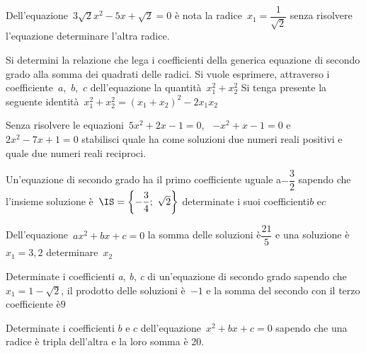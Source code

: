 \begin{esercizio}
 \label{ese:3.69}
Dell'equazione~\(3 \sqrt{2} x^{2}-5 x + \sqrt{2} = 0\) 
è nota la radice~\(x_{1} = \dfrac{1}{\sqrt{2}}\) 
senza risolvere l'equazione determinare l'altra radice.
\end{esercizio}

\begin{esercizio}
 \label{ese:3.70}
Si determini la relazione che lega i coefficienti della generica equazione 
di secondo grado alla somma dei quadrati delle radici. Si vuole esprimere,
attraverso i coefficiente~\(a\),~\(b\),~\(c\) dell'equazione la 
quantità~\(x_{1}^{2} + x_{2}^{2}\) 
Si tenga presente la seguente identità~\(x_{1}^{2} + x_{2}^{2} = 
(x_{1} + x_{2} )^{2}-2 x_{1} x_{2}\)
\end{esercizio}

\begin{esercizio}
 \label{ese:3.71}
Senza risolvere le equazioni~\(5 x^{2} + 2 x-1 = 0\), 
~\(-x^{2} + x-1 = 0\) e~\(2 x^{2}-7 x +1 = 0\) stabilisci quale ha come 
soluzioni due numeri reali positivi e quale due numeri reali reciproci.
\end{esercizio}

\begin{esercizio}
 \label{ese:3.72}
Un'equazione di secondo grado ha il primo coefficiente uguale a\(- 
\dfrac{3}{2}\) 
sapendo che l'insieme soluzione è~\(\IS = \left\{-\dfrac{3}{4};~\sqrt{2} 
\right\}\)
determinate i suoi coefficienti\(b\) e\(c\)
\end{esercizio}

\begin{esercizio}
 \label{ese:3.73}
Dell'equazione~\(a x^{2} + b x + c = 0\) la somma delle soluzioni 
è\(\dfrac{21}{5}\) e una soluzione è~\(x_{1} = 3,2\) determinare~\(x_{2}\)
\end{esercizio}

\begin{esercizio}
 \label{ese:3.74}
Determinate i coefficienti \emph{a}, \emph{b}, \emph{c} di un'equazione 
di secondo grado sapendo che~\(x_{1} = 1-\sqrt{2}\), il prodotto delle 
soluzioni è~\(-1\) e la somma del secondo con il terzo coefficiente è\(9\)
\end{esercizio}

\begin{esercizio}
 \label{ese:3.75}
Determinate i coefficienti \(b\) e \(c\) 
dell'equazione~\(x^{2} + b x + c = 0\) 
sapendo che una radice è tripla dell'altra e la loro somma è 20.
\end{esercizio}


